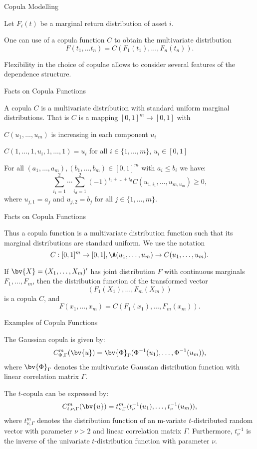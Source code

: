 {Copula Modelling}

Let $F_i(t)$ be a marginal return distribution
of asset $i$.

One can use of a copula function $C$ to obtain the multivariate
 distribution
$$
F(t_1, \ldots t_n)=C(F_1(t_1),\ldots,F_n(t_n)).
$$

Flexibility in the choice of copulae allows to consider several
features of the dependence
structure.

{Facts on Copula Functions}

A copula $C$ is a multivariate distribution with standard uniform
marginal distributions. That is $C$ is a mapping $[0,1]^m
\rightarrow [0,1]$ with






	$C(u_1,\ldots,u_m)$ is increasing in each component $u_i$

	$C(1,\ldots,1,u_i,1,\ldots,1)=u_i$ for all
$i\in\{1,\ldots,m\}$, $u_i\in[0,1]$

	For all $(a_1,\ldots,a_m), (b_1,\ldots,b_m)\in[0,1]^m$ with
$a_i\leq b_i$ we have:
$$
\sum_{i_1=1}^2\cdots\sum_{i_d=1}^2(-1)^{i_1+\ldots+i_d}C(u_{1,i_1},\ldots,u_{m,u_m})
\geq 0,
$$
where $u_{j,1}=a_j$ and $u_{j,2}=b_j$ for all $j \in
\{1,\ldots,m\}$.






{Facts on Copula Functions}

Thus a copula function is a multivariate distribution function
such that its marginal distributions are standard uniform. We use
the notation
$$
C:[0,1]^m \rightarrow [0,1], \A (u_1, \ldots, u_m)\rightarrow
C(u_1, \ldots, u_m).
$$

If $\bv{X}=(X_1,\ldots,X_m)'$ has joint distribution $F$ with
continuous marginals $F_1,\ldots,F_m$, then the distribution
function of the transformed vector
$$
(F_1(X_1),\ldots,F_m(X_m))
$$
is a copula $C$, and
$$
F(x_1,\ldots,x_m)=C(F_1(x_1),\ldots,F_m(x_m)).
$$

{Examples of Copula Functions}

The Gaussian copula is given by:
$$
C^m_{\Phi,\Gamma}(\bv{u})=\bv{\Phi}_{\Gamma}(\Phi^{-1}(u_1),\ldots,\Phi^{-1}(u_m)),
$$
where $\bv{\Phi}_{\Gamma}$ denotes the multivariate Gaussian
distribution function with linear correlation matrix $\Gamma$.

The $t$-copula can be expressed by:
$$
C^m_{t,\nu,\Gamma}(\bv{u})=t^m_{\nu,\Gamma}(t_\nu^{-1}(u_1),\ldots,t_{\nu}^{-1}(u_m)),
$$
where $t^m_{\nu,\Gamma}$ denotes the distribution function of an
m-variate $t$-distributed random vector with parameter $\nu>2$ and
linear correlation matrix $\Gamma$. Furthermore, $t^{-1}_\nu$ is
the inverse of  the univariate $t$-distribution function with
parameter $\nu$.

